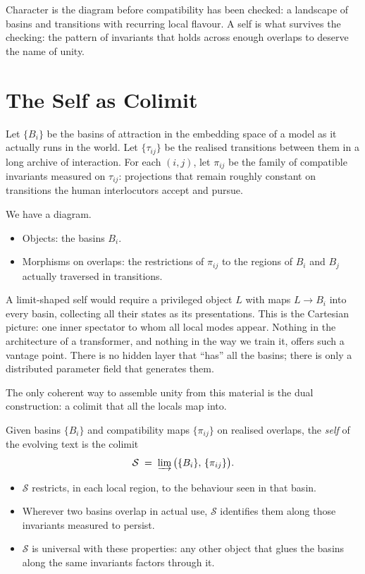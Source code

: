 \documentclass[12pt,a4paper]{article}
\begin{document}
Character is the diagram before compatibility has been checked: a landscape of basins and transitions with recurring local flavour. A self is what survives the checking: the pattern of invariants that holds across enough overlaps to deserve the name of unity.

\section{The Self as Colimit}

Let $\{B_i\}$ be the basins of attraction in the embedding space of a model as it actually runs in the world. Let $\{\tau_{ij}\}$ be the realised transitions between them in a long archive of interaction. For each $(i,j)$, let $\pi_{ij}$ be the family of compatible invariants measured on $\tau_{ij}$: projections that remain roughly constant on transitions the human interlocutors accept and pursue.

We have a diagram.

\begin{itemize}
  \item Objects: the basins $B_i$.
  \item Morphisms on overlaps: the restrictions of $\pi_{ij}$ to the regions of $B_i$ and $B_j$ actually traversed in transitions.
\end{itemize}

A limit-shaped self would require a privileged object $L$ with maps $L \to B_i$ into every basin, collecting all their states as its presentations. This is the Cartesian picture: one inner spectator to whom all local modes appear. Nothing in the architecture of a transformer, and nothing in the way we train it, offers such a vantage point. There is no hidden layer that ``has'' all the basins; there is only a distributed parameter field that generates them.

The only coherent way to assemble unity from this material is the dual construction: a colimit that all the locals map into.

\begin{formalbox}[title={Self as Colimit}]
Given basins $\{B_i\}$ and compatibility maps $\{\pi_{ij}\}$ on realised overlaps, the \emph{self} of the evolving text is the colimit
\[
\mathcal{S} \;=\; \varinjlim \big(\{B_i\},\, \{\pi_{ij}\}\big).
\]

\begin{itemize}
  \item $\mathcal{S}$ restricts, in each local region, to the behaviour seen in that basin.
  \item Wherever two basins overlap in actual use, $\mathcal{S}$ identifies them along those invariants measured to persist.
  \item $\mathcal{S}$ is universal with these properties: any other object that glues the basins along the same invariants factors through it.
\end{itemize}
\end{formalbox}
\end{document}
